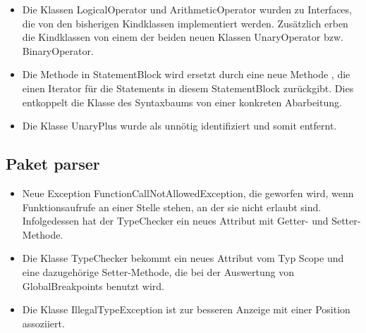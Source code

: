 \begin{itemize}
  \item Die Klassen LogicalOperator und ArithmeticOperator wurden zu Interfaces, die von den bisherigen Kindklassen implementiert werden. Zus\"{a}tzlich erben die Kindklassen von einem der beiden neuen Klassen UnaryOperator bzw. BinaryOperator.
  \item Die Methode  in StatementBlock wird ersetzt durch eine neue Methode , die einen Iterator f\"{u}r die Statements in diesem StatementBlock zur\"{u}ckgibt. Dies entkoppelt die Klasse des Syntaxbaums von einer konkreten Abarbeitung.
  \item Die Klasse UnaryPlus wurde als unn\"{o}tig identifiziert und somit entfernt.
\end{itemize}

\subsection{Paket parser}
\begin{itemize}
  \item Neue Exception FunctionCallNotAllowedException, die geworfen wird, wenn Funktionsaufrufe an einer Stelle stehen, an der sie nicht erlaubt sind. Infolgedessen hat der TypeChecker ein neues Attribut  mit Getter- und Setter-Methode.
  \item Die Klasse TypeChecker bekommt ein neues Attribut  vom Typ Scope und eine dazugeh\"{o}rige Setter-Methode, die bei der Auswertung von GlobalBreakpoints benutzt wird.
  \item Die Klasse IllegalTypeException ist zur besseren Anzeige mit einer Position assoziiert.
\end{itemize}

